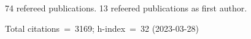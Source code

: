 74 refereed publications. 13 refeered publications as first author.

Total citations~=~3169; h-index~=~32 (2023-03-28)